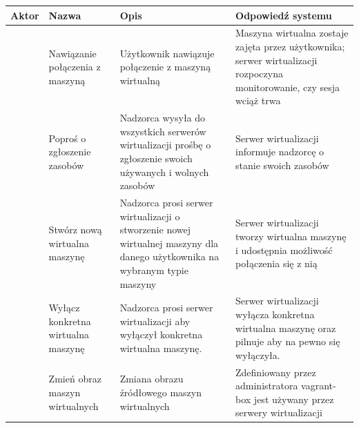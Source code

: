 \documentclass[12pt]{article}
\begin{document}
\begin{center}
	\begin{table}[h!]
		\begin{tabular}{|p{}|p{}|p{}|p{}|}
			\hline Aktor                                    & Nazwa                                 & Opis                                                                                                                         	& Odpowiedź systemu                                                                                                                \\ \hline
			\multirow{5}{=}{\rotatebox{90}{Użytkownik}}     & Nawiązanie połączenia z maszyną       & Użytkownik nawiązuje połączenie z maszyną wirtualną                                                                         	& Maszyna wirtualna zostaje zajęta przez użytkownika; serwer wirtualizacji rozpoczyna monitorowanie, czy sesja wciąż trwa \newline \\ \hline
			\multirow{13}{=}{\rotatebox{90}{Nadzorca}}       & Poproś o zgłoszenie zasobów           & Nadzorca wysyła do wszystkich serwerów wirtualizacji prośbę o zgłoszenie swoich używanych i wolnych zasobów                  	& Serwer wirtualizacji informuje nadzorcę o stanie swoich zasobów                                                                  \\ \cline{2-4}
															& Stwórz nową wirtualna maszynę         & Nadzorca prosi serwer wirtualizacji o stworzenie nowej wirtualnej maszyny dla danego użytkownika na wybranym typie maszyny                											& Serwer wirtualizacji tworzy wirtualna maszynę i udostępnia możliwość połączenia się z nią                                                    \\ \cline{2-4}
															& Wyłącz konkretna wirtualna maszynę    & Nadzorca prosi serwer wirtualizacji aby wyłączył konkretna wirtualna maszynę.                											& Serwer wirtualizacji wyłącza konkretna wirtualna maszynę oraz pilnuje aby na pewno się wyłączyła.                                                    \\ \hline
			\multirow{11}{=}{\rotatebox{90}{Administrator}} & Zmień obraz maszyn wirtualnych        & Zmiana obrazu źródłowego maszyn wirtualnych                                                                                  	& Zdefiniowany przez administratora vagrant-box jest używany przez serwery wirtualizacji                                           \\ \cline{2-4}

\end{tabular}
\end{table}
\end{center}
\end{document}
